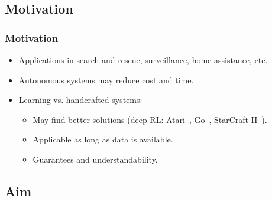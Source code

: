 \subsection{Motivation}

\begin{frame}
    \frametitle{Motivation}
    
    \begin{itemize}
        \item Applications in search and rescue, surveillance, home assistance, etc.
        \item Autonomous systems may reduce cost and time.
        \item Learning vs. handcrafted systems:
        \begin{itemize}
            \item May find better solutions (deep RL: Atari~\cite{mnih_human-level_2015}, Go~\cite{silver_mastering_2016}, StarCraft II~\cite{vinyals_grandmaster_2019}).
            \item Applicable as long as data is available.
            \item Guarantees and understandability.
        \end{itemize}
    \end{itemize}
\end{frame}

\subsection{Aim}

